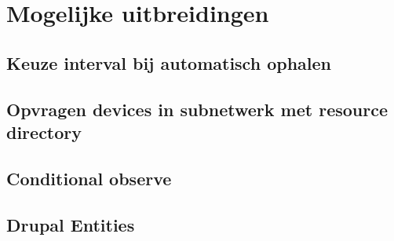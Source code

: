 \chapter{Mogelijke uitbreidingen} \label{uitbreidingen}

\section{Keuze interval bij automatisch ophalen}

\section{Opvragen devices in subnetwerk met resource directory}

\section{Conditional observe}

\section{Drupal Entities}